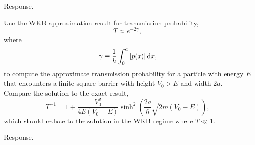 \documentclass[a4paper, 12pt]{config/homework}
\begin{document}
\begin{enumerate}
\bigskip
Response.

\pagebreak
Use the WKB approximation result for transmission probability,
\[T \approx e^{-2\gamma},\]
where
\[\gamma \equiv \frac{1}{\hbar}\int_{0}^{a}{|p(x)| \, \text{d}x},\]
to compute the approximate transmission probability for a particle with energy \(E\) that encounters a finite-square barrier with height \(V_0 > E\) and width \(2a\). Compare the solution to the exact result,
\[T^{-1} = 1 + \frac{V_0^2}{4E(V_0-E)}\sinh^2\left(\frac{2a}{\hbar}\sqrt{2m(V_0-E)}\right),\]
which should reduce to the solution in the WKB regime where \(T\ll 1\).

\bigskip
Response.

\end{enumerate}
\end{document}
